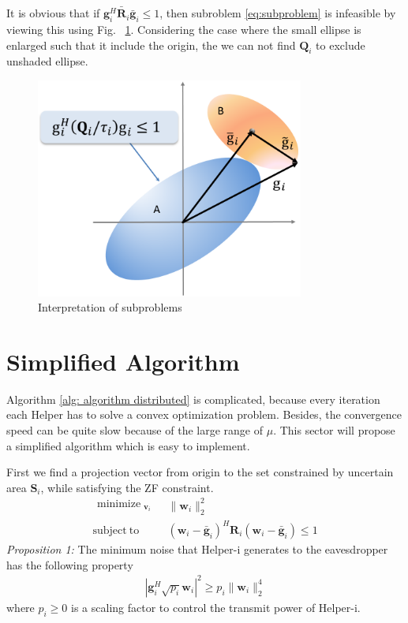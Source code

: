 \documentclass[conference]{IEEEtran}
\begin{document}
It is obvious that if $\bar{\mathbf{g}_i^H\mathbf{R}_i\bar{\mathbf{g}}_i} \leq 1$, then subroblem \eqref{eq:subproblem} is infeasible by viewing this using Fig. ~\ref{fig:interpretation of subproblems}. Considering the case where the small ellipse is enlarged such that it include the origin, the we can not find $\mathbf{Q}_i$ to exclude unshaded ellipse.


\begin{figure}[ht]
	\centering
	\includegraphics[width=8.8cm]{subproblem.png} %
	\caption{Interpretation of subproblems}
	\label{fig:interpretation of subproblems}
\end{figure}

\section{Simplified Algorithm} \label{sec:simplified algorithm}
Algorithm \ref{alg: algorithm distributed} is complicated, because every iteration each Helper has to solve a convex optimization problem. Besides, the convergence speed can be quite slow  because of the large range of $\mu$. This sector will propose a simplified algorithm which is easy to implement. 

First we find a projection vector from origin to the set constrained by uncertain area $\mathbf{S}_i$, while satisfying the ZF constraint.
\begin{equation}\label{eq:projection}
\begin{array}{ll}
\begin{split}
\mathop{\text{minimize}}_{\substack{\mathbf{v}_{i}}} 
\end{split}  
& \|\mathbf{w}_i\|_2^2\\
\mathrm{subject~to}
& (\mathbf{w}_i-\bar{\mathbf{g}}_i)^H\mathbf{R}_i(\mathbf{w}_i-\bar{\mathbf{g}}_i) \leq 1
\end{array}
\end{equation}
\emph{Proposition 1:} The minimum noise that Helper-i generates to the eavesdropper has the following property
\begin{eqnarray} \label{eq:simplified interference}
|\mathbf{g}_i^H\sqrt{p_i}\mathbf{w}_i|^2\geq p_i\|\mathbf{w}_i\|_2^4 \label{eq:simplified interference constraint}
\end{eqnarray}
where $p_i \geq 0$ is a scaling factor to control the transmit power of Helper-i. 
\end{document}
